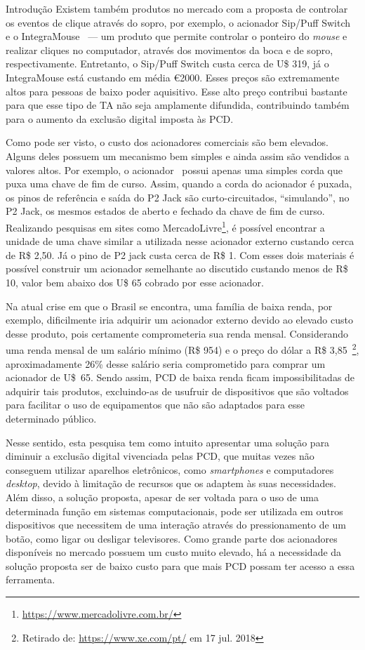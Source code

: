 \begin{chapter}{Introdução}
\vspace{-0.8cm}
Existem também produtos no mercado com a proposta de controlar os eventos de
clique através do sopro, por exemplo, o acionador Sip/Puff
Switch~\cite{SipPuff} e o IntegraMouse~\cite{IntegraMouse} --- um produto que
permite controlar o ponteiro do \textit{mouse} e realizar cliques no computador,
através dos movimentos da boca e de sopro, respectivamente. Entretanto, o
Sip/Puff Switch custa cerca de U\$ 319, já o IntegraMouse está custando em média
\euro 2000. Esses preços são extremamente altos para pessoas de baixo poder
aquisitivo. Esse alto preço contribui bastante para que esse tipo de TA não seja
amplamente difundida, contribuindo também para o aumento da exclusão digital
imposta às PCD.

\newpage
Como pode ser visto, o custo dos acionadores comerciais são bem elevados. Alguns
deles possuem um mecanismo bem simples e ainda assim são vendidos a valores
altos. Por exemplo, o acionador~\cite{StringSwitch} possui apenas uma simples
corda que puxa uma chave de fim de curso. Assim, quando a corda do acionador é
puxada, os pinos de referência e saída do P2 Jack são curto-circuitados,
``simulando'', no P2 Jack, os mesmos estados de aberto e fechado da chave de fim
de curso. Realizando pesquisas em sites como
MercadoLivre\footnote{\url{https://www.mercadolivre.com.br/}}, é possível
encontrar a unidade de uma chave similar a utilizada nesse acionador externo
custando cerca de R\$ 2,50. Já o pino de P2 jack custa cerca de R\$ 1. Com esses
dois materiais é possível construir um acionador semelhante ao discutido
custando menos de R\$ 10, valor bem abaixo dos U\$ 65 cobrado por esse
acionador. %

Na atual crise em que o Brasil se encontra, uma família de baixa renda, por
exemplo, dificilmente iria adquirir um acionador externo devido ao elevado custo
desse produto, pois certamente comprometeria sua renda mensal.  Considerando uma
renda mensal de um salário mínimo  (R\$ 954) e o preço do dólar a R\$
3,85~\footnote{Retirado de: \url{https://www.xe.com/pt/} em 17 jul. 2018},
aproximadamente 26\% desse salário seria comprometido para comprar um acionador
de U\$~65. Sendo assim, PCD de baixa renda ficam impossibilitadas de adquirir
tais produtos, excluindo-as de usufruir de dispositivos que são voltados para
facilitar o uso de equipamentos que não são adaptados para esse determinado
público. %

Nesse sentido, esta pesquisa tem como intuito apresentar uma solução para
diminuir a exclusão digital vivenciada pelas PCD, que muitas vezes não conseguem
utilizar aparelhos eletrônicos, como \textit{smartphones} e computadores
\textit{desktop}, devido à limitação de recursos que os adaptem às suas
necessidades. Além disso, a solução proposta, apesar de ser voltada para o uso de
uma determinada função em sistemas computacionais, pode ser utilizada em outros
dispositivos que necessitem de uma interação através do pressionamento de um
botão, como ligar ou desligar televisores. Como grande parte dos acionadores
disponíveis no mercado possuem um custo muito elevado, há a necessidade da
solução proposta ser de baixo custo para que mais PCD possam ter
acesso a essa ferramenta. 


\end{chapter}
